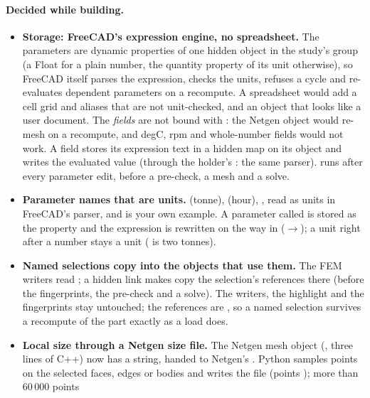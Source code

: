 \paragraph{Decided while building.}
\begin{itemize}[nosep]
  \item \textbf{Storage: FreeCAD's expression engine, no spreadsheet.} The parameters are dynamic properties of one hidden
         object in the study's group (a Float for a plain number, the quantity property of its unit
        otherwise), so FreeCAD itself parses the expression, checks the units, refuses a cycle and re-evaluates dependent
        parameters on a recompute. A spreadsheet would add a cell grid and aliases that are not unit-checked, and an object that
        looks like a user document. The \emph{fields} are not bound with : the Netgen object would re-mesh
        on a recompute, and degC, rpm and whole-number fields would not work. A field stores its expression text in a hidden
        map on its object and  writes the evaluated value (through the holder's : the
        same parser).  runs after every parameter edit, before a pre-check, a mesh and a solve.
  \item \textbf{Parameter names that are units.}  (tonne),  (hour), ,  read as units in
        FreeCAD's parser, and  is your own example. A parameter called  is stored as the property
         and the expression is rewritten on the way in ($\to$); a unit right after a number
        stays a unit ( is two tonnes).
  \item \textbf{Named selections copy into the objects that use them.} The FEM writers read ; a hidden link
         makes  copy the selection's references there (before the fingerprints, the
        pre-check and a solve). The writers, the highlight and the fingerprints stay untouched; the references are
        , so a named selection survives a recompute of the part exactly as a load does.
  \item \textbf{Local size through a Netgen size file.} The Netgen mesh object (, three lines
        of C++) now has a  string, handed to Netgen's . Python samples points on the
        selected faces, edges or bodies and writes the  file (points ); more than 60\,000 points

\end{itemize}
